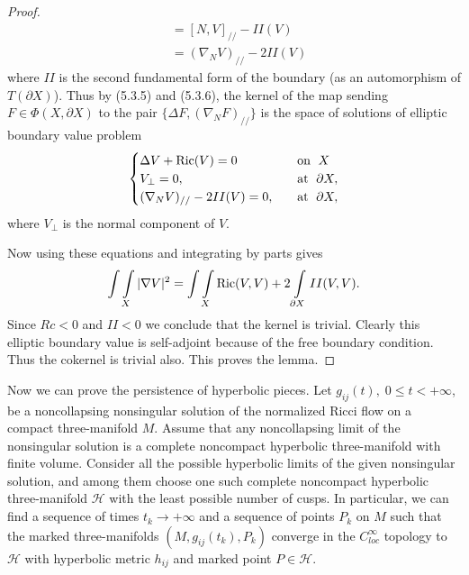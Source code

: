 \begin{proof}
\begin{align}
&  = [N,V]_{//} - II(V) \nonumber\\
&  = (\nabla_NV)_{//} - 2II(V) \nonumber
\end{align} %
where $II$ is the second fundamental form of the boundary (as an
automorphism of $T(\partial X)$). Thus by (5.3.5) and (5.3.6), the
kernel of the map sending $F\in \Phi(X,\partial X)$ to the pair
$\{\Delta F,(\nabla_NF)_{//}\}$ is the space of solutions of
elliptic boundary value problem \begin{equation}
\begin{cases}
\Delta V+\Ric(V)=0 &\quad \text{on }\;X\\
V_{\bot}=0,&\quad \text{at }\;\partial X,\\
(\nabla_NV)_{//}-2II(V)=0,&\quad \text{at } \;\partial X,
\end{cases} %
\end{equation} where $V_\bot$ is the normal component of $V$.

Now using these equations and integrating by parts gives
$$
\int\int\limits_X|\nabla V|^2
=\int\int\limits_X\operatorname{Ric}(V,V)+2\int\limits_{\partial X}II(V,V).
$$
Since $Rc<0$ and $II<0$ we conclude that the kernel is trivial.
Clearly this elliptic boundary value is self-adjoint because of
the free boundary condition. Thus the cokernel is trivial also.
This proves the lemma.
\end{proof}

Now we can prove the persistence of hyperbolic pieces. Let
$g_{ij}(t),\;0\le t< +\infty$, be a noncollapsing nonsingular
solution of the normalized Ricci flow on a compact three-manifold
$M$. Assume that any noncollapsing limit of the nonsingular
solution is a complete noncompact hyperbolic three-manifold with
finite volume. Consider all the possible hyperbolic limits of the
given nonsingular solution, and among them choose one such
complete noncompact hyperbolic three-manifold $\mathcal{H}$ with
the least possible number of cusps. In particular, we can find a
sequence of times $t_k\rightarrow +\infty$ and a sequence of
points $P_k$ on $M$ such that the marked three-manifolds
$(M,g_{ij}(t_k),P_k)$ converge in the $C^\infty_{loc}$ topology to
$\mathcal{H}$ with hyperbolic metric $h_{ij}$ and marked point
$P\in \mathcal{H}$.

